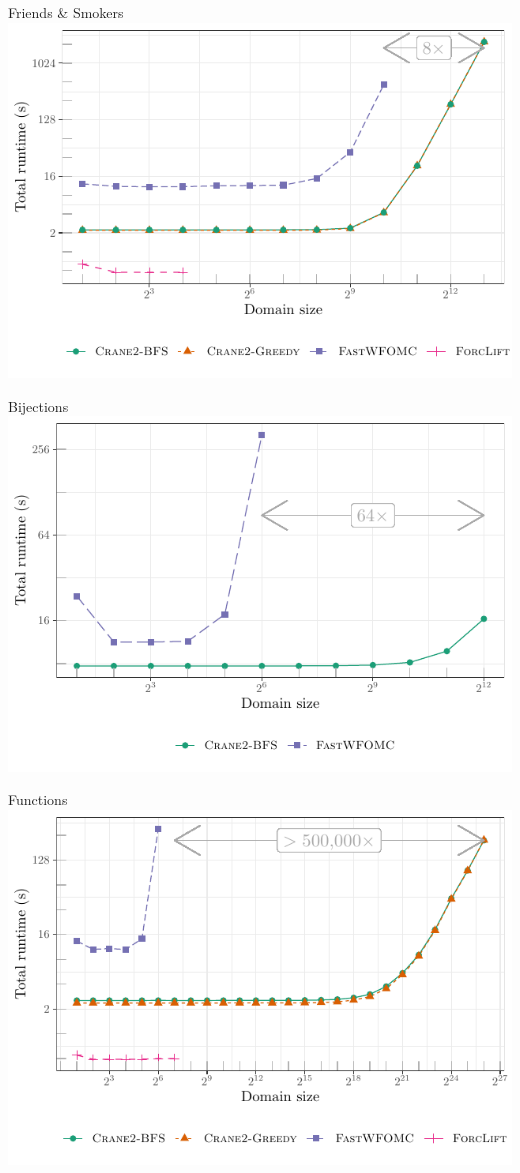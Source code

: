 \documentclass{beamer}
\begin{document}
\begin{frame}{Friends \& Smokers}
  \centering
  \includegraphics{friends.pdf}
\end{frame}

\begin{frame}{Bijections}
  \centering
  \includegraphics{bijections.pdf}
\end{frame}

\begin{frame}{Functions}
  \centering
  \includegraphics{functions.pdf}
\end{frame}
\end{document}
